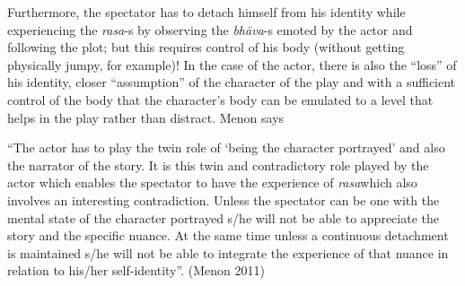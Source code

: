 Furthermore, the spectator has to detach himself from his identity while experiencing the \textsl{rasa}-s by observing the \textsl{bhāva}-s emoted by the actor and following the plot; but this requires control of his body (without getting physically jumpy, for example)! In the case of the actor, there is also the “loss” of his identity, closer “assumption” of the character of the play and with a sufficient control of the body that the character’s body can be emulated to a level that helps in the play rather than distract. Menon says 

\begin{myquote}
“The actor has to play the twin role of ‘being the character portrayed’ and also the narrator of the story. It is this twin and contradictory role played by the actor which enables the spectator to have the experience of \textsl{rasa}which also involves an interesting contradiction. Unless the spectator can be one with the mental state of the character portrayed s/he will not be able to appreciate the story and the specific nuance. At the same time unless a continuous detachment is maintained s/he will not be able to integrate the experience of that nuance in relation to his/her self-identity”. 
\hfill(Menon 2011)
\end{myquote}

